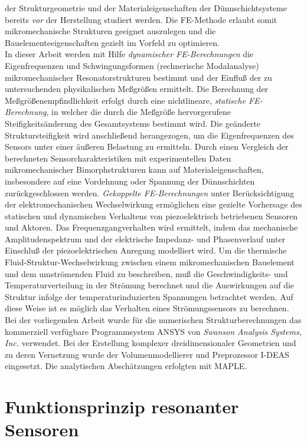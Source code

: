 der Strukturgeometrie und der Materialeigenschaften der Dünnschichtsysteme
bereits {\em vor} der Herstellung studiert werden. Die FE-Methode erlaubt
somit mikromechanische Strukturen geeignet auszulegen und die
Bauelementeeigenschaften gezielt
im Vorfeld zu optimieren.\\
In dieser Arbeit werden mit Hilfe {\em dynamischer FE-Berechnungen}
die Eigenfrequenzen und Schwingungsformen (rechnerische Modalanalyse)
mikromechanischer Resonatorstrukturen bestimmt
und der Einfluß der zu untersuchenden physikalischen Meßgrößen
ermittelt. Die Berechnung der Meßgrößenempfindlichkeit erfolgt
durch eine nichtlineare, {\em statische FE-Berechnung}, in welcher die
durch die Meßgröße hervorgerufene Steifigkeitsänderung des Gesamtsystems
bestimmt wird. Die geänderte Struktursteifigkeit wird anschließend
herangezogen, um die Eigenfrequenzen des Sensors unter einer äußeren
Belastung zu ermitteln. Durch einen Vergleich der berechneten
Sensorcharakteristiken mit experimentellen Daten mikromechanischer
Bimorphstrukturen kann auf Materialeigenschaften, insbesondere auf eine
Vordehnung oder Spannung der Dünnschichten zurückgeschlossen werden.
{\em  Gekoppelte FE-Berechnungen} unter
Berücksichtigung der elektromechanischen Wechselwirkung ermöglichen eine
gezielte Vorhersage des statischen und dynamischen Verhaltens von
piezoelektrisch betriebenen Sensoren und Aktoren. Das Frequenzgangverhalten
wird ermittelt, indem das mechanische Amplitudenspektrum und der
elektrische Impedanz- und Phasenverlauf unter Einschluß der
piezoelektrischen Anregung modelliert wird. Um die thermische
Fluid-Struktur-Wechselwirkung zwischen einem mikromechanischen
Bauelement und dem umströmenden Fluid zu beschreiben, muß die
Geschwindigkeits- und Temperaturverteilung in der Strömung berechnet
und die Auswirkungen auf die Struktur infolge der temperaturinduzierten
Spannungen betrachtet werden. Auf diese Weise ist es möglich das Verhalten
eines Strömungssensors zu berechnen.\\
Bei der vorliegenden Arbeit wurde für die numerischen Strukturberechnungen
das kommerziell verfügbare Programmsystem {\sf ANSYS} von
{\sl Swanson Analysis Systems, Inc.} \cite{SASI} verwendet.
Bei der Erstellung komplexer dreidimensionaler Geometrien
und zu deren Vernetzung wurde der Volumenmodellierer und Preprozessor
{\sf I-DEAS} \cite{SDRC} eingesetzt. Die analytischen Abschätzungen
erfolgten mit {\sf MAPLE}.


\section{Funktionsprinzip resonanter Sensoren}
\label{funktionsprinzip}

